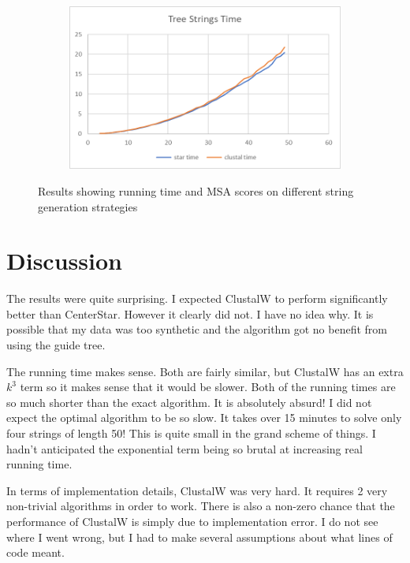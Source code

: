 \documentclass[11pt]{article}
\begin{document}
\begin{figure}
\begin{subfigure}[b]{0.49 \textwidth}
        \caption{}
        \label{fig:randomTime}
    \end{subfigure}
    ~
    \begin{subfigure}[b]{0.49 \textwidth}
        \centering
        \includegraphics[width=\textwidth]{image009.png}
        \caption{}
        \label{fig:treeTime}
    \end{subfigure}
    \caption{Results showing running time and MSA scores on different string generation strategies}
    \label{fig:all_results}
\end{figure}

\section{Discussion}
The results were quite surprising.
I expected ClustalW to perform significantly better than CenterStar.
However it clearly did not. 
I have no idea why.
It is possible that my data was too synthetic
and the algorithm got no benefit from using the guide tree.

The running time makes sense. Both are fairly similar, but ClustalW has an extra $k^3$ term
so it makes sense that it would be slower.
Both of the running times are so much shorter than the exact algorithm.
It is absolutely absurd! I did not expect the optimal algorithm to be so slow.
It takes over 15 minutes to solve only four strings of length 50!
This is quite small in the grand scheme of things. 
I hadn't anticipated the exponential term being so brutal at increasing real running time.

In terms of implementation details, ClustalW was very hard.
It requires 2 very non-trivial algorithms in order to work.
There is also a non-zero chance that the performance of ClustalW is simply due to implementation error.
I do not see where I went wrong, but I had to make several assumptions about what lines of code meant.


\nocite{*}
\singlespacing


\end{document}
